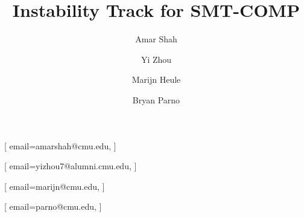 \documentclass[
]{ceurart}
\begin{document}


\title{Instability Track for SMT-COMP}



\author[1]{Amar Shah}[
  email=amarshah@cmu.edu,
]

\author[2]{Yi Zhou}[
  email=yizhou7@alumni.cmu.edu,
]

\author[1]{Marijn Heule}[
  email=marijn@cmu.edu,
]

\author[1]{Bryan Parno}[
  email=parno@cmu.edu,
]

\address[1]{Carnegie Mellon University, Pittsburgh, PA, USA}
\address[2]{Amazon Web Services, New York, NY, USA}





\end{document}
